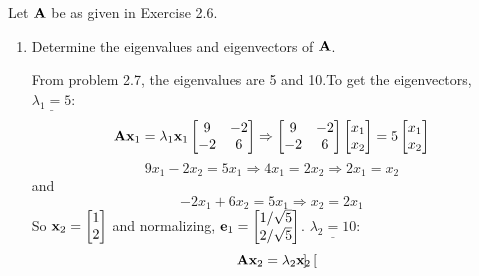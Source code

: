         Let $\bold{A}$ be as given in Exercise 2.6.
        \begin{enumerate}[label=(\alph*)]
            \item Determine the eigenvalues and eigenvectors of $\bold{A}$.
            \par
            From problem 2.7, the eigenvalues are 5 and 10.To get the eigenvectors,
            \newline
            $\underline{\lambda_1 = 5}$:
            \[
                \bold{A}\bold{x}_1 = \lambda_1 \bold{x}_1
                \begin{bmatrix}
                    9 & -2 \\
                    -2 & 6
                \end{bmatrix} \Rightarrow
                \begin{bmatrix}
                    9 & -2 \\
                    -2 & 6
                \end{bmatrix}
                \begin{bmatrix}
                    x_1 \\
                    x_2
                \end{bmatrix} = 
                5\begin{bmatrix}
                    x_1 \\
                    x_2
                \end{bmatrix}
            \]
            \[
                9x_1 - 2x_2 = 5x_1 \Rightarrow 4x_1 = 2x_2 \Rightarrow 2x_1 = x_2
            \]
            and
            \[
                -2x_1 + 6x_2 = 5x_1 \Rightarrow x_2 = 2x_1
            \]
            So $\bold{x}_2 = \begin{bmatrix}
                1 \\
                2
            \end{bmatrix}$ and normalizing, $\bold{e}_1 = \begin{bmatrix}
                1/\sqrt{5} \\
                2/\sqrt{5}
            \end{bmatrix}$.
            \newline
            $\underline{\lambda_2 = 10}$:
            \[
                \bold{A}\bold{x}_2 = \lambda_2 \bold{x}_2
                \begin{bmatrix}

\end{bmatrix}\]
\end{enumerate}
